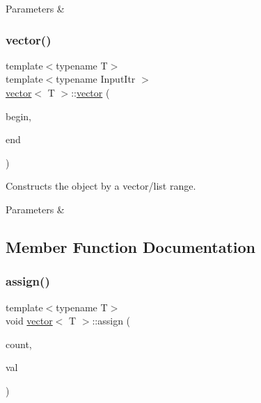 \begin{DoxyParams}{Parameters}
{\em } & \\
\hline
\end{DoxyParams}
\mbox{\label{classvector_a7d26c70dd3a1215357889bb3e0361b87}} 
\subsubsection{\texorpdfstring{vector()}{vector()}\hspace{0.1cm}{\footnotesize\ttfamily [6/6]}}
{\footnotesize\ttfamily template$<$typename T$>$ \\
template$<$typename Input\+Itr $>$ \\
\hyperlink{classvector}{vector}$<$ T $>$\+::\hyperlink{classvector}{vector} (\begin{DoxyParamCaption}\item[{Input\+Itr}]{begin,  }\item[{Input\+Itr}]{end }\end{DoxyParamCaption})\hspace{0.3cm}{\ttfamily [inline]}}



Constructs the object by a vector/list range. 


\begin{DoxyParams}{Parameters}
{\em } & \\
\hline
\end{DoxyParams}


\subsection{Member Function Documentation}
\mbox{\label{classvector_a9fa84fecacbe2ac4861c2e7db19047e0}} 
\subsubsection{\texorpdfstring{assign()}{assign()}\hspace{0.1cm}{\footnotesize\ttfamily [1/3]}}
{\footnotesize\ttfamily template$<$typename T$>$ \\
void \hyperlink{classvector}{vector}$<$ T $>$\+::assign (\begin{DoxyParamCaption}\item[{\hyperlink{classvector_a4d06f3ade0c2ac023b7a7edb85d9d1ef}{size\+\_\+type}}]{count,  }\item[{\hyperlink{classvector_aad263433b4072dfbc26ace0df6441960}{const\+\_\+reference}}]{val }\end{DoxyParamCaption})\hspace{0.3cm}{\ttfamily [inline]}}



